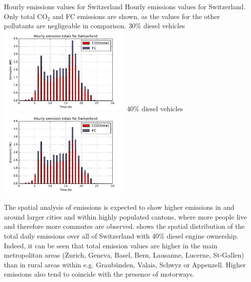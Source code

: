 \createfigure%
{Hourly emissions values for Switzerland}%
{Hourly emissions values for Switzerland. Only total CO$_2$ and FC emissions are shown, as the values for the other pollutants are negligeable in comparison.}%
{\label{fig:hourlyEmissions}}%
{%
  \createsubfigure%
  {30\% diesel vehicles}%
  {\includegraphics[width=0.49\textwidth,
angle=0]{figures/hourly_emissions_30pct_diesel.pdf}}%
  {\label{fig:hourlyEmissions-30pctDiesel}}%
  {}%
  \createsubfigure%
  {40\% diesel vehicles}%
  {\includegraphics[width=0.49\textwidth,
angle=0]{figures/hourly_emissions_40pct_diesel.pdf}}%
  {}%
}%
{}

The spatial analysis of emissions is expected to show higher emissions in and around larger cities and within highly populated cantons, where more people live and therefore more commutes are observed.
 shows the spatial distribution of the total daily emissions over all of Switzerland with 40\% diesel engine ownership.
Indeed, it can be seen that total emission values are higher in the main metropolitan areas (Zurich, Geneva, Basel, Bern, Lausanne, Lucerne, St-Gallen) than in rural areas within e.g. Graub\"unden, Valais, Schwyz or Appenzell.
Higher emissions also tend to coincide with the presence of motorways.

